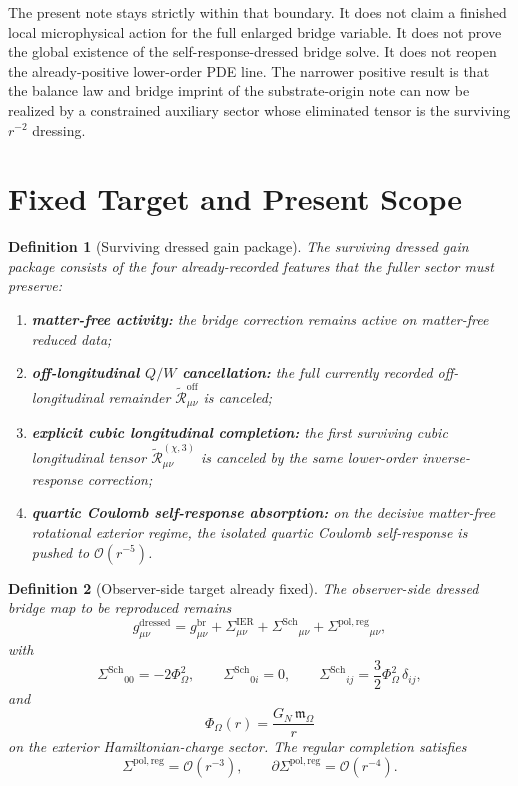 \documentclass[11pt]{article}
\newcommand{\FlowPot}{\Phi_\Omega}
\newcommand{\HamChargeOmega}{\mathfrak m_\Omega}
\newcommand{\SigmaIER}{\Sigma^{\mathrm{IER}}}
\newcommand{\SigmaRegPol}{\Sigma^{\mathrm{pol,reg}}}
\newcommand{\SigmaDressSch}{\Sigma^{\mathrm{Sch}}}
\newcommand{\ReOff}{\widetilde{\mathcal R}_{\mu\nu}^{\mathrm{off}}}
\newcommand{\ReLongThree}{\widetilde{\mathcal R}_{\mu\nu}^{(\chi,3)}}
\newtheorem{definition}{Definition}
\begin{document}
The present note stays strictly within that boundary. It does not claim a finished local microphysical action for the full enlarged bridge variable. It does not prove the global existence of the self-response-dressed bridge solve. It does not reopen the already-positive lower-order PDE line. The narrower positive result is that the balance law and bridge imprint of the substrate-origin note can now be realized by a constrained auxiliary sector whose eliminated tensor is the surviving \(r^{-2}\) dressing.

\section{Fixed Target and Present Scope}

\begin{definition}[Surviving dressed gain package]
\label{def:gains}
The \emph{surviving dressed gain package} consists of the four already-recorded features that the fuller sector must preserve:
\begin{enumerate}
    \item \textbf{matter-free activity:} the bridge correction remains active on matter-free reduced data;
    \item \textbf{off-longitudinal \(Q/W\) cancellation:} the full currently recorded off-longitudinal remainder \(\ReOff\) is canceled;
    \item \textbf{explicit cubic longitudinal completion:} the first surviving cubic longitudinal tensor \(\ReLongThree\) is canceled by the same lower-order inverse-response correction;
    \item \textbf{quartic Coulomb self-response absorption:} on the decisive matter-free rotational exterior regime, the isolated quartic Coulomb self-response is pushed to \(\mathcal O(r^{-5})\).
\end{enumerate}
\end{definition}

\begin{definition}[Observer-side target already fixed]
\label{def:target}
The observer-side dressed bridge map to be reproduced remains
\begin{equation}
g_{\mu\nu}^{\mathrm{dressed}}
=
g_{\mu\nu}^{\mathrm{br}}
+\SigmaIER_{\mu\nu}
+\SigmaDressSch{}_{\mu\nu}
+\SigmaRegPol{}_{\mu\nu},
\label{eq:targetmetric}
\end{equation}
with
\begin{equation}
\SigmaDressSch{}_{00}=-2\FlowPot^2,
\qquad
\SigmaDressSch{}_{0i}=0,
\qquad
\SigmaDressSch{}_{ij}=\frac32\FlowPot^2\,\delta_{ij},
\label{eq:schdress}
\end{equation}
and
\begin{equation}
\FlowPot(r)=\frac{G_N\,\HamChargeOmega}{r}
\label{eq:phiext}
\end{equation}
on the exterior Hamiltonian-charge sector. The regular completion satisfies
\begin{equation}
\SigmaRegPol=\mathcal O(r^{-3}),
\qquad
\partial\SigmaRegPol=\mathcal O(r^{-4}).
\label{eq:reg}
\end{equation}
\end{definition}
\end{document}

